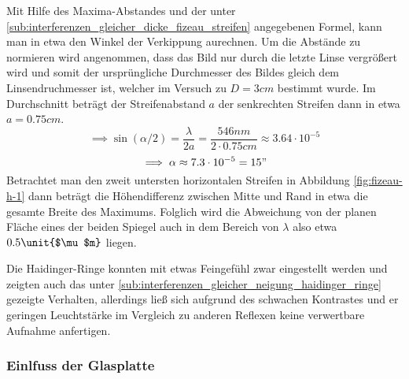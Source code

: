 			Mit Hilfe des Maxima-Abstandes und der unter \ref{sub:interferenzen_gleicher_dicke_fizeau_streifen} angegebenen Formel, kann man in etwa den Winkel der Verkippung aurechnen.
			Um die Abstände zu normieren wird angenommen, dass das Bild nur durch die letzte Linse vergrößert wird und somit der ursprüngliche Durchmesser des Bildes gleich dem Linsendruchmesser ist, welcher im Versuch zu $D = 3 \unit{cm} $ bestimmt wurde.
			Im Durchschnitt beträgt der Streifenabstand $a$ der senkrechten Streifen dann in etwa $a = 0.75 \unit{cm}$.
			\[ \implies \sin(\alpha /2) = \frac{\lambda}{2 a} = \frac{546 \unit{nm}}{2 \cdot 0.75 \unit{cm}} 
			\approx 3.64 \cdot 10^{-5} \]
			\[ \implies \alpha \approx 7.3 \cdot 10^{-5} = 15 "\]
			Betrachtet man den zweit untersten horizontalen Streifen in Abbildung \ref{fig:fizeau-h-1} dann beträgt die Höhendifferenz zwischen Mitte und Rand in etwa die gesamte Breite des Maximums.
			Folglich wird die Abweichung von der planen Fläche eines der beiden Spiegel auch in dem Bereich von $\lambda$ also etwa $0.5 \unit{$\mu$m}$ liegen.

			Die Haidinger-Ringe konnten mit etwas Feingefühl zwar eingestellt werden und zeigten auch das unter \ref{sub:interferenzen_gleicher_neigung_haidinger_ringe} gezeigte Verhalten, allerdings ließ sich aufgrund des schwachen Kontrastes und er geringen Leuchtstärke im Vergleich zu anderen Reflexen keine verwertbare Aufnahme anfertigen.



		\subsubsection{Einlfuss der Glasplatte} %
		\label{ssub:einlfuss_der_glasplatte}


